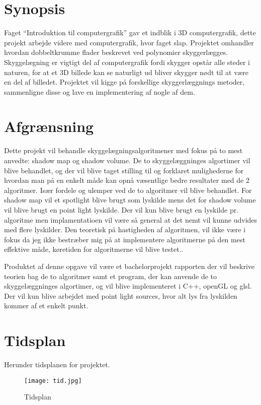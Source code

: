 \documentclass[11pt,a4paper]{article}
\begin{document}
\section{Synopsis}
Faget “Introduktion til computergrafik” gav et indblik i 3D computergrafik, dette projekt arbejde videre med computergrafik, hvor faget slap. Projektet omhandler hvordan dobbeltkrumme flader beskrevet ved polynomier skyggerlægges. Skyggelægning er vigtigt del af computergrafik fordi skygger opstår alle steder i naturen, for at et 3D billede kan se naturligt ud bliver skygger nødt til at være en del af billedet. Projektet vil kigge på forskellige skyggerlæggnings metoder, sammenligne disse og lave en implementering af nogle af dem.

\section{Afgrænsning}
Dette projekt vil behandle skyggelægningsalgoritmener med fokus på to mest anvedte: shadow map og shadow volume. De to skyggelæggninges algortimer vil blive behandlet, og der vil blive taget stilling til og forklaret mulighederne for hvordan man på en enkelt måde kan opnå væsentlige bedre resultater med de 2 algoritmer. Især fordele og ulemper ved de to algoritmer vil blive behandlet. For shadow map vil et spotlight blive brugt som lyskilde mens det for shadow volume vil blive brugt en point light lyskilde. Der vil kun blive brugt en lyskilde pr. algoritme men implamentatioen vil være så general at det nemt vil kunne udvides med flere lyskilder. Den teoretisk på hastigheden af algoritmen,  vil ikke være i fokus da jeg ikke bestræber mig på at implementere algoritmerne på den mest effektive måde, køretiden for algoritmerne vil blive testet..

Produktet af denne opgave vil være et bachelorprojekt rapporten der vil beskrive teorien bag de to algoritmer samt et program, der kan anvende de to skyggelæggninges algortimer, og vil blive implementeret i C++, openGL og glsl. Der vil kun blive arbejdet med point light sources, hvor alt lys fra lyskilden kommer af et enkelt punkt.
\section{Tidsplan}

Herunder tidsplanen for projektet.

\begin{figure}[ht!]
\centering
\texttt{[image: tid.jpg]}
\caption{Tidsplan}
\label{S4}
\end{figure}
\end{document}
